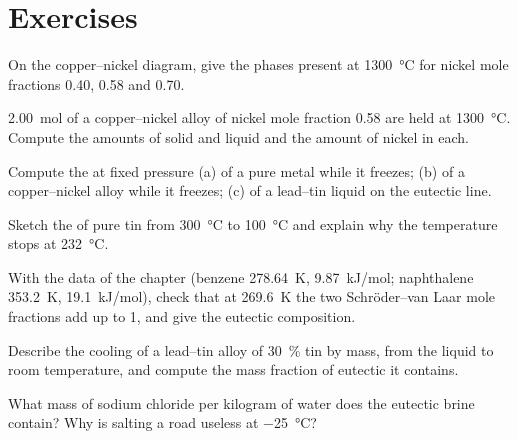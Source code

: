\section{Exercises}

\begin{exercise}[$\star$]\label{exo:b2:solid-liquid-diagrams:1}
On the copper--nickel diagram, give the phases present at
\qty{1300}{\degreeCelsius} for nickel mole fractions 0.40, 0.58 and 0.70.
\end{exercise}

\begin{exercise}[$\star$]\label{exo:b2:solid-liquid-diagrams:2}
\qty{2.00}{mol} of a copper--nickel alloy of nickel mole fraction 0.58 are held
at \qty{1300}{\degreeCelsius}. Compute the amounts of solid and liquid and the
amount of nickel in each.
\end{exercise}

\begin{exercise}[$\star$]\label{exo:b2:solid-liquid-diagrams:3}
Compute the  at fixed pressure (a) of a pure metal while it freezes;
(b) of a copper--nickel alloy while it freezes; (c) of a lead--tin liquid on the
eutectic line.
\end{exercise}

\begin{exercise}[$\star$]\label{exo:b2:solid-liquid-diagrams:4}
Sketch the  of pure tin from \qty{300}{\degreeCelsius} to
\qty{100}{\degreeCelsius} and explain why the temperature stops at
\qty{232}{\degreeCelsius}.
\end{exercise}

\begin{exercise}[$\star\star$]\label{exo:b2:solid-liquid-diagrams:5}
With the data of the chapter (benzene \qty{278.64}{K}, \qty{9.87}{kJ/mol};
naphthalene \qty{353.2}{K}, \qty{19.1}{kJ/mol}), check that at
\qty{269.6}{K} the two Schr\"oder--van Laar mole fractions add up to 1, and give
the eutectic composition.
\end{exercise}

\begin{exercise}[$\star\star$]\label{exo:b2:solid-liquid-diagrams:6}
Describe the cooling of a lead--tin alloy of 30~\% tin by mass, from the liquid
to room temperature, and compute the mass fraction of eutectic it contains.
\end{exercise}

\begin{exercise}[$\star\star$]\label{exo:b2:solid-liquid-diagrams:7}
What mass of sodium chloride per kilogram of water does the eutectic brine
contain? Why is salting a road useless at \qty{-25}{\degreeCelsius}?
\end{exercise}

